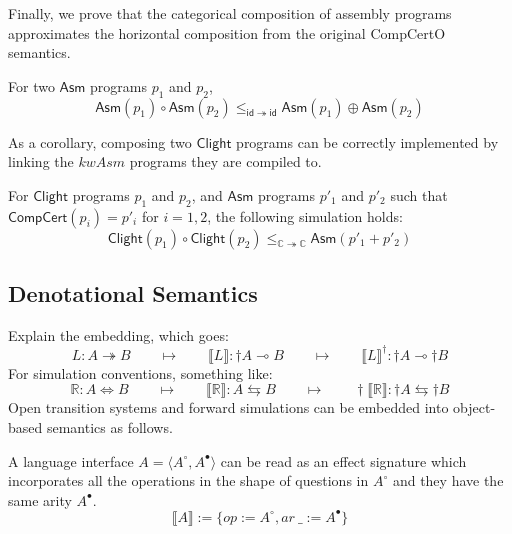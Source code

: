 \documentclass[sigplan,10pt,review,anonymous]{acmart}
\newcommand{\kw}[1]{\ensuremath{ \mathsf{#1} }}
\begin{document}
Finally, we prove that the categorical composition of assembly programs
approximates the horizontal composition from the original CompCertO
semantics.
\begin{theorem}
  For two \kw{Asm} programs $p_1$ and $p_2$,
  \[
    \kw{Asm}(p_1) \circ \kw{Asm}(p_2) \le_{\kw{id} \twoheadrightarrow \kw{id}}
    \kw{Asm}(p_1) \oplus \kw{Asm}(p_2)
  \]
\end{theorem}
As a corollary, composing two $\kw{Clight}$ programs can be correctly
implemented by linking the $kw{Asm}$ programs they are compiled to.
\begin{corollary}
  For $\kw{Clight}$ programs $p_1$ and $p_2$, and $\kw{Asm}$ programs
  $p'_1$ and $p'_2$ such that $\kw{CompCert}(p_i) = p'_i$ for $i=1,2$,
  the following simulation holds:
  \[
    \kw{Clight}(p_1)\circ\kw{Clight}(p_2) \le_{\mathbb{C} \twoheadrightarrow \mathbb{C}}
    \kw{Asm}(p'_1 + p'_2)
  \]
\end{corollary}

\subsection{Denotational Semantics}

Explain the embedding, which goes:
\[
  L : A \twoheadrightarrow B
  \qquad \mapsto \qquad
  \llbracket L \rrbracket : {\dagger} A \multimap B
  \qquad \mapsto \qquad
  \llbracket L \rrbracket^\dagger : {\dagger} A \multimap {\dagger} B
\]
For simulation conventions, something like:
\[
  \mathbb{R} : A \Leftrightarrow B
  \qquad \mapsto \qquad
  \llbracket \mathbb{R} \rrbracket : A \leftrightarrows B
  \qquad \mapsto \qquad
  {\dagger}\llbracket \mathbb{R} \rrbracket :
    {\dagger}A \leftrightarrows {\dagger}B
\]
Open transition systems and forward simulations can be embedded into
object-based semantics as follows.

A language interface
$A = \langle A^\circ, A^\bullet \rangle$ can be read as an effect signature
which incorporates all the operations in the shape of questions in $A^\circ$ and
they have the same arity $A^\bullet$.
\[
  \llbracket A \rrbracket \mathrel{:=}
  \{ op \mathrel{:=} A^\circ, ar\ \_ \mathrel{:=} A^\bullet \}
\]
\end{document}

